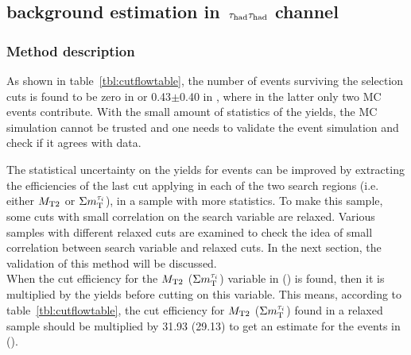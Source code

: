 \subsection{\texorpdfstring{\wjets background estimation in $\,\tau_{\rm had}\tau_{\rm had}$ channel}{Wjets background estimation in tau-tau channel}}
\label{sect:bkgW}
\subsubsection{Method description}
As shown in table~\ref{tbl:cutflowtable}, the number of \wjets events surviving 
the selection cuts is found to be zero in \binone or 0.43$\pm$0.40 
in \bintwo, where in the latter only two MC events contribute. With the small amount of statistics of the \wjets yields, the \wjets MC simulation cannot be trusted and one needs to validate the \wjets event simulation and check if it agrees with data.

 The statistical uncertainty on the yields for \wjets events can be improved by extracting 
the efficiencies of the last cut applying in each of the two search regions (i.e. either ${M_{\rm T2}}$ or $\Sigma m_{\rm T}^{\tau_i}$), in a sample with more statistics. To make this sample, some cuts with small correlation on the search variable are 
relaxed. Various samples with different relaxed cuts are examined to check the idea of small correlation 
between search variable and relaxed cuts. In the next section, the validation of this method will be discussed.\\
When the cut efficiency for the ${M_{\rm T2}}$ ($\Sigma m_{\rm T}^{\tau_i}$) variable in \binone (\bintwo) is found, then it is multiplied by the \wjets 
yields before cutting on this variable. This means, according to table~\ref{tbl:cutflowtable}, the cut efficiency for 
${M_{\rm T2}}$ ($\Sigma m_{\rm T}^{\tau_i}$) found in a relaxed sample should be multiplied by 31.93 (29.13) to get an 
estimate for the \wjets events in  \binone (\bintwo).\\

